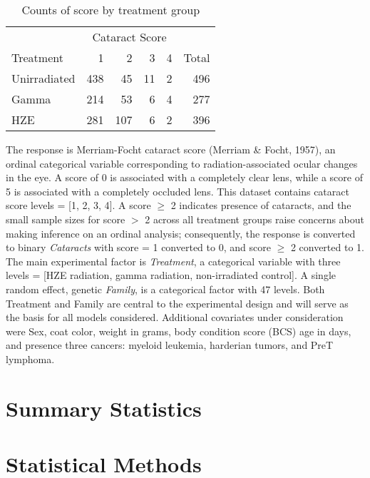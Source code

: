 \documentclass[12pt]{article}
\begin{document}
\begin{wraptable}{r}{0pt}
\centering
\begin{tabular}{lrrrrr}
  \toprule
\multicolumn{1}{c}{ } & \multicolumn{4}{c}{Cataract Score} & \multicolumn{1}{c}{ } \\
\cmidrule(l{3pt}r{3pt}){2-5}
Treatment & 1 & 2 & 3 & 4 & Total \\ 
  \midrule
Unirradiated & 438 &  45 &  11 &   2 & 496 \\ 
  Gamma & 214 &  53 &   6 &   4 & 277 \\ 
  HZE & 281 & 107 &   6 &   2 & 396 \\ 
   \bottomrule
\end{tabular}
\caption{Counts of score by treatment group} 
\end{wraptable}

The response is Merriam-Focht cataract score (Merriam \& Focht, 1957),
an ordinal categorical variable corresponding to radiation-associated
ocular changes in the eye. A score of 0 is associated with a completely
clear lens, while a score of 5 is associated with a completely occluded
lens. This dataset contains cataract score levels = {[}1, 2, 3, 4{]}. A
score \(\ge\) 2 indicates presence of cataracts, and the small sample
sizes for score \(>\) 2 across all treatment groups raise concerns about
making inference on an ordinal analysis; consequently, the response is
converted to binary \emph{Cataracts} with score = 1 converted to 0, and
score \(\ge\) 2 converted to 1. The main experimental factor is
\emph{Treatment}, a categorical variable with three levels = {[}HZE
radiation, gamma radiation, non-irradiated control{]}. A single random
effect, genetic \emph{Family}, is a categorical factor with 47 levels.
Both Treatment and Family are central to the experimental design and
will serve as the basis for all models considered. Additional covariates
under consideration were Sex, coat color, weight in grams, body
condition score (BCS) age in days, and presence three cancers: myeloid
leukemia, harderian tumors, and PreT lymphoma.

\section{Summary Statistics}
\label{sec:sumstats}

\section{Statistical Methods}
\label{sec:methods}
\end{document}
